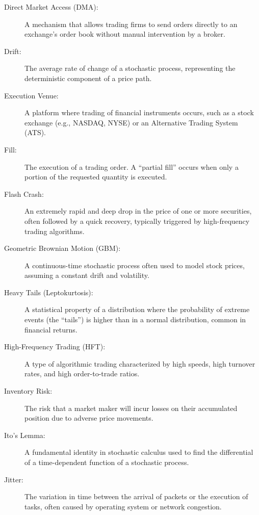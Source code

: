 \begin{description}
    \item[Direct Market Access (DMA):] A mechanism that allows trading firms to send orders directly to an exchange's order book without manual intervention by a broker.
    
    \item[Drift:] The average rate of change of a stochastic process, representing the deterministic component of a price path.
    
    \item[Execution Venue:] A platform where trading of financial instruments occurs, such as a stock exchange (e.g., NASDAQ, NYSE) or an Alternative Trading System (ATS).
    
    \item[Fill:] The execution of a trading order. A ``partial fill'' occurs when only a portion of the requested quantity is executed.
    
    \item[Flash Crash:] An extremely rapid and deep drop in the price of one or more securities, often followed by a quick recovery, typically triggered by high-frequency trading algorithms.
    
    \item[Geometric Brownian Motion (GBM):] A continuous-time stochastic process often used to model stock prices, assuming a constant drift and volatility.

    \item[Heavy Tails (Leptokurtosis):] A statistical property of a distribution where the probability of extreme events (the ``tails'') is higher than in a normal distribution, common in financial returns.
    
    \item[High-Frequency Trading (HFT):] A type of algorithmic trading characterized by high speeds, high turnover rates, and high order-to-trade ratios.
    
    \item[Inventory Risk:] The risk that a market maker will incur losses on their accumulated position due to adverse price movements.

    \item[Ito's Lemma:] A fundamental identity in stochastic calculus used to find the differential of a time-dependent function of a stochastic process.
    
    \item[Jitter:] The variation in time between the arrival of packets or the execution of tasks, often caused by operating system or network congestion.
    

\end{description}
